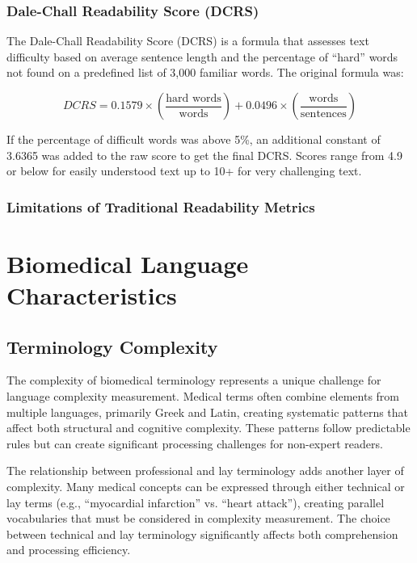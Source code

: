 \subsubsection{Dale-Chall Readability Score (DCRS)}

The Dale-Chall Readability Score (DCRS) is a formula that assesses text difficulty based on average sentence length and the percentage of ``hard'' words not found on a predefined list of 3,000 familiar words. The original formula was:

$$DCRS = 0.1579 \times \left(\frac{\text{hard words}}{\text{words}}\right) + 0.0496 \times \left(\frac{\text{words}}{\text{sentences}}\right)$$

If the percentage of difficult words was above 5\%, an additional constant of 3.6365 was added to the raw score to get the final DCRS. Scores range from 4.9 or below for easily understood text up to 10+ for very challenging text.

\subsubsection{Limitations of Traditional Readability Metrics}



\section{Biomedical Language Characteristics}

\subsection{Terminology Complexity}
The complexity of biomedical terminology represents a unique challenge for language complexity measurement. 
Medical terms often combine elements from multiple languages, primarily Greek and Latin, creating systematic patterns that affect both structural and cognitive complexity. 
These patterns follow predictable rules but can create significant processing challenges for non-expert readers.

The relationship between professional and lay terminology adds another layer of complexity. 
Many medical concepts can be expressed through either technical or lay terms (e.g., ``myocardial infarction'' vs. ``heart attack''), creating parallel vocabularies that must be considered in complexity measurement. 
The choice between technical and lay terminology significantly affects both comprehension and processing efficiency.